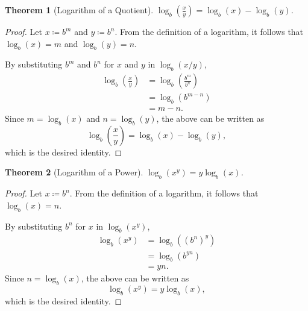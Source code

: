\documentclass[headings=standardclasses]{scrartcl}
\newtheorem{theorem}{Theorem}
\theoremstyle{definition}
\begin{document}
\begin{theorem}[Logarithm of a Quotient]
  \(\displaystyle \log_{b}\left(\frac{x}{y}\right) = \log_{b}(x) -
  \log_{b}(y)\).
\end{theorem}

\begin{proof}
  Let \(x ≔ b^m\) and \(y ≔ b^n\). From the definition of a logarithm, it
  follows that \(\log_b(x) = m\) and \(\log_b(y) = n\).

  By substituting \(b^m\) and \(b^n\) for \(x\) and \(y\) in \(\log_b(x/y)\),
  \begin{equation*}
  \begin{split}
    \log_b\left(\frac{x}{y}\right) &= \log_b\left(\frac{b^m}{b^n}\right) \\
                                   &= \log_b(b^{m - n}) \\
                                   &= m - n.
  \end{split}
  \end{equation*}
  Since \(m = \log_b(x)\) and \(n = \log_b(y)\), the above can be written as
  \begin{equation*}
    \log_b\left(\frac{x}{y}\right) = \log_{b}(x) - \log_{b}(y),
  \end{equation*}
  which is the desired identity.
\end{proof}

\begin{theorem}[Logarithm of a Power]
  \(\displaystyle \log_{b}(x^y) = y\log_{b}(x)\).
\end{theorem}

\begin{proof}
  Let \(x ≔ b^n\). From the definition of a logarithm, it
  follows that \(\log_b(x) = n\).

  By substituting \(b^n\) for \(x\) in \(\log_b(x^y)\),
  \begin{equation*}
  \begin{split}
    \log_b(x^y) &= \log_b({(b^n)}^y) \\
                &= \log_b(b^{yn}) \\
                &= yn.
  \end{split}
  \end{equation*}
  Since \(n = \log_b(x)\), the above can be written as
  \begin{equation*}
    \log_b(x^y) = y\log_b(x),
  \end{equation*}
  which is the desired identity.
\end{proof}
\end{document}
